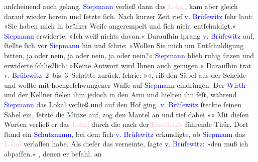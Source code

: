               anſcheinend auch gelang. \textcolor{blue}{Siepmann}{}\ledrightnote{\textcolor{blue}{Theodor Siepmann}} verließ
               dann das \textcolor{pink}{Lokal}{}, kam aber
               gleich darauf wieder herein und ſetzte ſich. Nach kurzer Zeit rief \textcolor{blue}{v. Brüſewitz}{}\ledrightnote{\textcolor{blue}{Henning von Brüsewitz}} ſehr laut: »Sie haben mich in brüſker Weiſe
               angerempelt und ſich nicht entſchuldigt.« \textcolor{blue}{Siepmann}{}\ledrightnote{\textcolor{blue}{Theodor Siepmann}} erwiderte: »Ich weiß nichts davon.« Daraufhin ſprang \textcolor{blue}{v. Brüſewitz}{}\ledrightnote{\textcolor{blue}{Henning von Brüsewitz}} auf, ſtellte ſich vor \textcolor{blue}{Siepmann}{}\ledrightnote{\textcolor{blue}{Theodor Siepmann}} hin und ſchrie: »Wollen Sie mich um
               Entſchuldigung bitten, ja oder nein, ja oder nein, ja oder nein?« \textcolor{blue}{Siepmann}{}\ledrightnote{\textcolor{blue}{Theodor Siepmann}} blieb ruhig ſitzen und erwiderte ſchließlich:
               »Keine Antwort wird Ihnen auch genügen.« Daraufhin trat \textcolor{blue}{v. Brüſewitz}{}\ledrightnote{\textcolor{blue}{Henning von Brüsewitz}} 2 bis 3 Schritte zurück, ſchrie: »«, riß den Säbel aus
               der Scheide und wollte mit hochgeſchwungener Waffe auf \textcolor{blue}{Siepmann}{}\ledrightnote{\textcolor{blue}{Theodor Siepmann}} eindringen. Der \textcolor{blue}{Wirth}{} und der Kellner fielen ihm jedoch in den Arm und
               hielten ihn feſt, während \textcolor{blue}{Siepmann}{}\ledrightnote{\textcolor{blue}{Theodor Siepmann}} das Lokal
               verließ und auf den Hof ging. \textcolor{blue}{v. Brüſewitz}{}\ledrightnote{\textcolor{blue}{Henning von Brüsewitz}}
               ſteckte ſeinen Säbel ein, ſetzte die Mütze auf, zog den Mantel an und rief dabei »« Mit dieſen Worten verließ er das \textcolor{pink}{Lokal}{} durch die nach der \textcolor{pink}{Karlſtraße}{}\ledrightnote{\textcolor{pink}{Karlstraße}} führende Thür. Dort ſtand ein \textcolor{blue}{Schutzmann}{}, bei dem ſich \textcolor{blue}{v. Brüſewitz}{}\ledrightnote{\textcolor{blue}{Henning von Brüsewitz}} erkundigte, ob \textcolor{blue}{Siepmann}{}\ledrightnote{\textcolor{blue}{Theodor Siepmann}} das \textcolor{pink}{Lokal}{} verlaſſen habe. Als dieſer das verneinte, ſagte \textcolor{blue}{v. Brüſewitz}{}\ledrightnote{\textcolor{blue}{Henning von Brüsewitz}}: »den muß ich abpaſſen.« , denen er befahl, an
